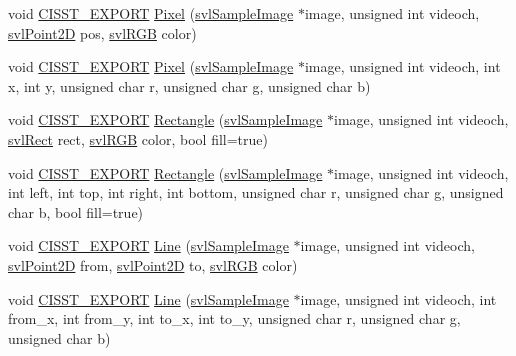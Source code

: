 \begin{DoxyCompactItemize}
\item 
void \hyperlink{cmn_export_macros_8h_a99393e0c3ac434b2605235bbe20684f8}{C\-I\-S\-S\-T\-\_\-\-E\-X\-P\-O\-R\-T} \hyperlink{namespacesvl_draw_a6ced26bb0782fd7b66d21fdfba03caf6}{Pixel} (\hyperlink{classsvl_sample_image}{svl\-Sample\-Image} $\ast$image, unsigned int videoch, \hyperlink{structsvl_point2_d}{svl\-Point2\-D} pos, \hyperlink{structsvl_r_g_b}{svl\-R\-G\-B} color)
\item 
void \hyperlink{cmn_export_macros_8h_a99393e0c3ac434b2605235bbe20684f8}{C\-I\-S\-S\-T\-\_\-\-E\-X\-P\-O\-R\-T} \hyperlink{namespacesvl_draw_a5afdb4fd346733807ca5d3af3e1a8a22}{Pixel} (\hyperlink{classsvl_sample_image}{svl\-Sample\-Image} $\ast$image, unsigned int videoch, int x, int y, unsigned char r, unsigned char g, unsigned char b)
\item 
void \hyperlink{cmn_export_macros_8h_a99393e0c3ac434b2605235bbe20684f8}{C\-I\-S\-S\-T\-\_\-\-E\-X\-P\-O\-R\-T} \hyperlink{namespacesvl_draw_accdb755d3ede3899ecefc2929707f851}{Rectangle} (\hyperlink{classsvl_sample_image}{svl\-Sample\-Image} $\ast$image, unsigned int videoch, \hyperlink{structsvl_rect}{svl\-Rect} rect, \hyperlink{structsvl_r_g_b}{svl\-R\-G\-B} color, bool fill=true)
\item 
void \hyperlink{cmn_export_macros_8h_a99393e0c3ac434b2605235bbe20684f8}{C\-I\-S\-S\-T\-\_\-\-E\-X\-P\-O\-R\-T} \hyperlink{namespacesvl_draw_a4c6b75beb811a810407f6fb262566fb4}{Rectangle} (\hyperlink{classsvl_sample_image}{svl\-Sample\-Image} $\ast$image, unsigned int videoch, int left, int top, int right, int bottom, unsigned char r, unsigned char g, unsigned char b, bool fill=true)
\item 
void \hyperlink{cmn_export_macros_8h_a99393e0c3ac434b2605235bbe20684f8}{C\-I\-S\-S\-T\-\_\-\-E\-X\-P\-O\-R\-T} \hyperlink{namespacesvl_draw_aa6839dcba1603c373ba9ea2e0e6ebaa5}{Line} (\hyperlink{classsvl_sample_image}{svl\-Sample\-Image} $\ast$image, unsigned int videoch, \hyperlink{structsvl_point2_d}{svl\-Point2\-D} from, \hyperlink{structsvl_point2_d}{svl\-Point2\-D} to, \hyperlink{structsvl_r_g_b}{svl\-R\-G\-B} color)
\item 
void \hyperlink{cmn_export_macros_8h_a99393e0c3ac434b2605235bbe20684f8}{C\-I\-S\-S\-T\-\_\-\-E\-X\-P\-O\-R\-T} \hyperlink{namespacesvl_draw_a776cf92bdd4ef25028e5d5868e82fa4f}{Line} (\hyperlink{classsvl_sample_image}{svl\-Sample\-Image} $\ast$image, unsigned int videoch, int from\-\_\-x, int from\-\_\-y, int to\-\_\-x, int to\-\_\-y, unsigned char r, unsigned char g, unsigned char b)

\end{DoxyCompactItemize}
